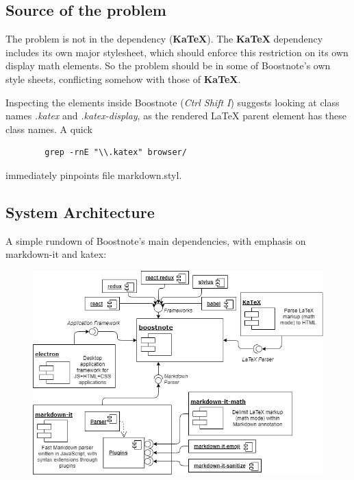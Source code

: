 \documentclass[main.tex]{subfiles}
\begin{document}
\subsection{Source of the problem}

The problem is not in the dependency (\textbf{KaTeX}). The \textbf{KaTeX} dependency includes its own major stylesheet, which should enforce this restriction on its own display math elements. So the problem should be in some of Boostnote's own style sheets, conflicting somehow with those of \textbf{KaTeX}.

Inspecting the elements inside Boostnote (\textit{Ctrl Shift I}) suggests looking at class names \textit{.katex} and \textit{.katex-display}, as the rendered LaTeX parent element has these class names. A quick

\begin{verbatim}
        grep -rnE "\\.katex" browser/
\end{verbatim}

immediately pinpoints file markdown.styl.

\subsection{System Architecture}

A simple rundown of Boostnote's main dependencies, with emphasis on markdown-it and katex:

\begin{figure}[h]
\includegraphics[scale=0.6]{images/diagram.png}
\centering
\end{figure}
\end{document}
